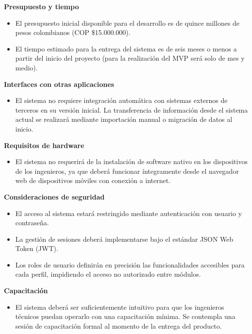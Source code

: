\documentclass[12pt,a4paper]{article}
\begin{document}
\textbf{Presupuesto y tiempo}

\begin{itemize}
  \item El presupuesto inicial disponible para el desarrollo es de quince millones de pesos colombianos (COP \$15.000.000).

  \item El tiempo estimado para la entrega del sistema es de seis meses o menos a partir del inicio del proyecto (para la realización del MVP será solo de mes y medio).
\end{itemize}

\textbf{Interfaces con otras aplicaciones}

\begin{itemize}
  \item El sistema no requiere integración automática con sistemas externos de terceros en su versión inicial. La transferencia de información desde el sistema actual se realizará mediante importación manual o migración de datos al inicio.
\end{itemize}

\textbf{Requisitos de hardware}

\begin{itemize}
  \item El sistema no requerirá de la instalación de software nativo en los dispositivos de los ingenieros, ya que deberá funcionar íntegramente desde el navegador web de dispositivos móviles con conexión a internet.
\end{itemize}

\textbf{Consideraciones de seguridad}

\begin{itemize}
  \item El acceso al sistema estará restringido mediante autenticación con usuario y contraseña.

  \item La gestión de sesiones deberá implementarse bajo el estándar JSON Web Token (JWT).

  \item Los roles de usuario definirán en precisión las funcionalidades accesibles para cada perfil, impidiendo el acceso no autorizado entre módulos.
\end{itemize}

\textbf{Capacitación}

\begin{itemize}
  \item El sistema deberá ser suficientemente intuitivo para que los ingenieros técnicos puedan operarlo con una capacitación mínima. Se contempla una sesión de capacitación formal al momento de la entrega del producto.
\end{itemize}
\end{document}
